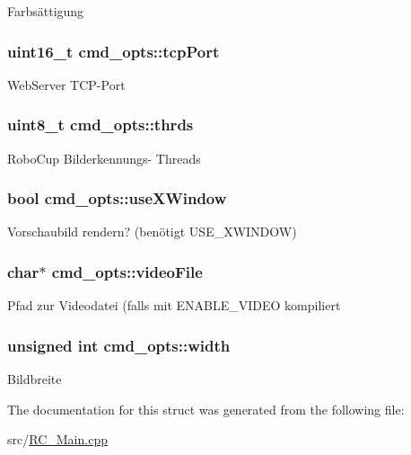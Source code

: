 Farbsättigung \hypertarget{structcmd__opts_a2f37e990a3592777d92c156548422150}{
\subsubsection[{tcp\+Port}]{\setlength{\rightskip}{0pt plus 5cm}uint16\+\_\+t cmd\+\_\+opts\+::tcp\+Port}}\label{structcmd__opts_a2f37e990a3592777d92c156548422150}
Web\+Server T\+C\+P-\/\+Port \hypertarget{structcmd__opts_a7518cdbdbc6ed1b8cc404aa675f383a6}{
\subsubsection[{thrds}]{\setlength{\rightskip}{0pt plus 5cm}uint8\+\_\+t cmd\+\_\+opts\+::thrds}}\label{structcmd__opts_a7518cdbdbc6ed1b8cc404aa675f383a6}
Robo\+Cup Bilderkennungs-\/ Threads \hypertarget{structcmd__opts_aee44e8161de659e8fff50e09100f9ada}{
\subsubsection[{use\+X\+Window}]{\setlength{\rightskip}{0pt plus 5cm}bool cmd\+\_\+opts\+::use\+X\+Window}}\label{structcmd__opts_aee44e8161de659e8fff50e09100f9ada}
Vorschaubild rendern? (benötigt U\+S\+E\+\_\+\+X\+W\+I\+N\+D\+O\+W) \hypertarget{structcmd__opts_acee5a1c6793898bbda38d6d7fb5de431}{
\subsubsection[{video\+File}]{\setlength{\rightskip}{0pt plus 5cm}char$\ast$ cmd\+\_\+opts\+::video\+File}}\label{structcmd__opts_acee5a1c6793898bbda38d6d7fb5de431}
Pfad zur Videodatei (falls mit E\+N\+A\+B\+L\+E\+\_\+\+V\+I\+D\+E\+O kompiliert \hypertarget{structcmd__opts_a0f13b6290e7e33c22a258c11ed23f72f}{
\subsubsection[{width}]{\setlength{\rightskip}{0pt plus 5cm}unsigned int cmd\+\_\+opts\+::width}}\label{structcmd__opts_a0f13b6290e7e33c22a258c11ed23f72f}
Bildbreite 

The documentation for this struct was generated from the following file\+:\begin{DoxyCompactItemize}
\item 
src/\hyperlink{RC__Main_8cpp}{R\+C\+\_\+\+Main.\+cpp}\end{DoxyCompactItemize}
